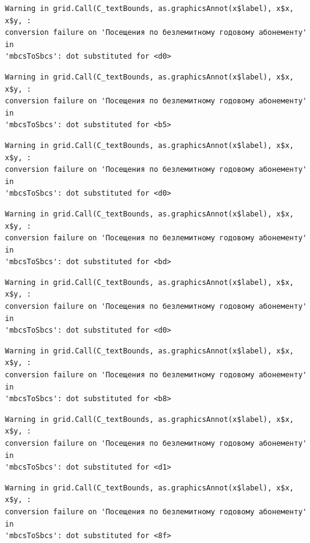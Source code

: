 \documentclass[
  letterpaper,
  DIV=11,
  numbers=noendperiod]{scrartcl}
\begin{document}
\begin{verbatim}
Warning in grid.Call(C_textBounds, as.graphicsAnnot(x$label), x$x, x$y, :
conversion failure on 'Посещения по безлемитному годовому абонементу' in
'mbcsToSbcs': dot substituted for <d0>
\end{verbatim}

\begin{verbatim}
Warning in grid.Call(C_textBounds, as.graphicsAnnot(x$label), x$x, x$y, :
conversion failure on 'Посещения по безлемитному годовому абонементу' in
'mbcsToSbcs': dot substituted for <b5>
\end{verbatim}

\begin{verbatim}
Warning in grid.Call(C_textBounds, as.graphicsAnnot(x$label), x$x, x$y, :
conversion failure on 'Посещения по безлемитному годовому абонементу' in
'mbcsToSbcs': dot substituted for <d0>
\end{verbatim}

\begin{verbatim}
Warning in grid.Call(C_textBounds, as.graphicsAnnot(x$label), x$x, x$y, :
conversion failure on 'Посещения по безлемитному годовому абонементу' in
'mbcsToSbcs': dot substituted for <bd>
\end{verbatim}

\begin{verbatim}
Warning in grid.Call(C_textBounds, as.graphicsAnnot(x$label), x$x, x$y, :
conversion failure on 'Посещения по безлемитному годовому абонементу' in
'mbcsToSbcs': dot substituted for <d0>
\end{verbatim}

\begin{verbatim}
Warning in grid.Call(C_textBounds, as.graphicsAnnot(x$label), x$x, x$y, :
conversion failure on 'Посещения по безлемитному годовому абонементу' in
'mbcsToSbcs': dot substituted for <b8>
\end{verbatim}

\begin{verbatim}
Warning in grid.Call(C_textBounds, as.graphicsAnnot(x$label), x$x, x$y, :
conversion failure on 'Посещения по безлемитному годовому абонементу' in
'mbcsToSbcs': dot substituted for <d1>
\end{verbatim}

\begin{verbatim}
Warning in grid.Call(C_textBounds, as.graphicsAnnot(x$label), x$x, x$y, :
conversion failure on 'Посещения по безлемитному годовому абонементу' in
'mbcsToSbcs': dot substituted for <8f>
\end{verbatim}
\end{document}
